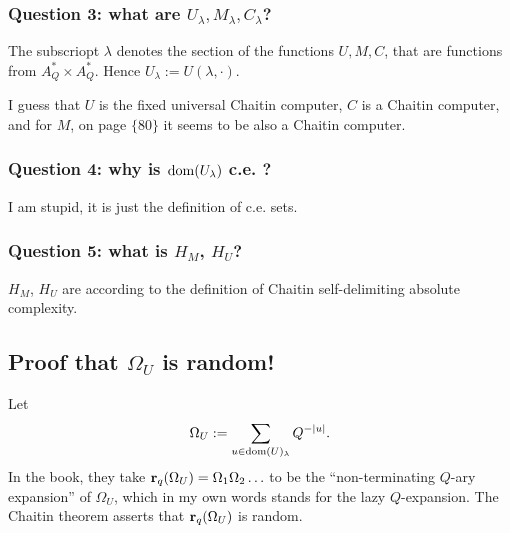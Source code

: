 \documentclass{article}
\begin{document}
\subsubsection{ Question 3: what are $U_\lambda,M_\lambda,C_\lambda$?}

The subscriopt $\lambda$ denotes the section of the functions $U,M,C$, that are functions from $A_Q^\ast \times A_Q^\ast$. Hence $U_\lambda := U(\lambda,\cdot)$. 

I guess that $U$ is the fixed universal Chaitin computer, $C$ is a Chaitin computer, and for $M$, on page $\{80\}$ it seems to be also a Chaitin computer.

\subsubsection{ Question 4: why is $\operatorname{dom} (U_\lambda)$ c.e. ?}

I am stupid, it is just the definition of c.e. sets.


\subsubsection{ Question 5: what is $H_M$, $H_U$?}

$H_M$, $H_U$ are according to the definition of Chaitin self-delimiting absolute complexity.


\subsection{Proof that $\Omega_U$ is random!}

Let 
\begin{equation}
    \Omega_U := \sum_{u \in \operatorname{dom} (U)_\lambda} Q^{-|u|}. 
\end{equation}
In the book, they take ${\bf r}_q(\Omega_U) = \Omega_1\Omega_2\ldots$ to be the ``non-terminating $Q$-ary expansion'' of $\Omega_U$, which in my own words stands for the lazy $Q$-expansion. The Chaitin theorem asserts that ${\bf r}_q(\Omega_U)$ is random.
\end{document}
